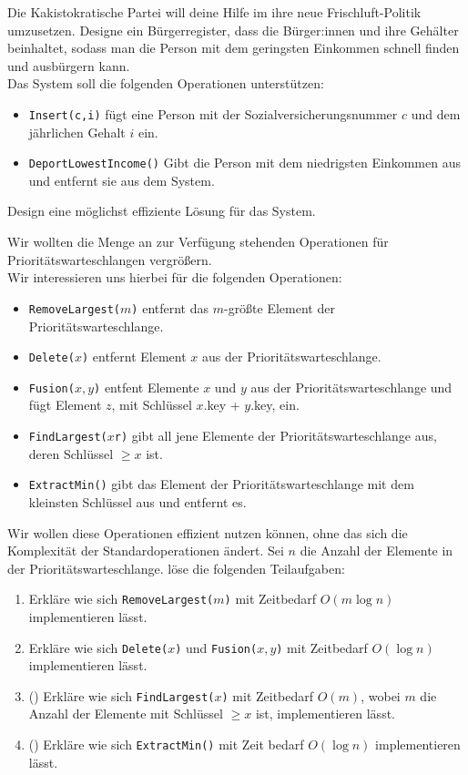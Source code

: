 \documentclass{uebung_cs}
\begin{document}
\begin{aufgabe}
	Die Kakistokratische Partei will deine Hilfe im ihre neue \glqq Frischluft\grqq{}-Politik umzusetzen.
	Designe ein Bürgerregister, dass die Bürger:innen und ihre Gehälter beinhaltet, sodass man die Person mit dem geringsten Einkommen schnell finden und ausbürgern kann.\\
	Das System soll die folgenden Operationen unterstützen:
	\begin{itemize}
		\item \texttt{Insert(c,i)} fügt eine Person mit der Sozialversicherungsnummer $c$ und dem jährlichen Gehalt $i$ ein.
		\item \texttt{DeportLowestIncome()} Gibt die Person mit dem niedrigsten Einkommen aus und entfernt sie aus dem System.
	\end{itemize}
	Design eine möglichst effiziente Lösung für das System.
\end{aufgabe}

\begin{aufgabe}
	Wir wollten die Menge an zur Verfügung stehenden Operationen für Prioritätswarteschlangen vergrößern.\\
	Wir interessieren uns hierbei für die folgenden Operationen:
	\begin{itemize}
		\item \texttt{RemoveLargest($m$)} entfernt das $m$-größte Element der Prioritätswarteschlange.
		\item \texttt{Delete($x$)} entfernt Element $x$ aus der Prioritätswarteschlange.
		\item \texttt{Fusion($x,y$)} entfent Elemente $x$ und $y$ aus der Prioritätswarteschlange und fügt Element $z$, mit Schlüssel $x$.key + $y$.key, ein.
		\item \texttt{FindLargest($x$r)} gibt all jene Elemente der Prioritätswarteschlange aus, deren Schlüssel $\geq x$ ist.
		\item \texttt{ExtractMin()} gibt das Element der Prioritätswarteschlange mit dem kleinsten Schlüssel aus und entfernt es.
	\end{itemize}
	Wir wollen diese Operationen effizient nutzen können, ohne das sich die Komplexität der Standardoperationen ändert.
	Sei $n$ die Anzahl der Elemente in der Prioritätswarteschlange.
	löse die folgenden Teilaufgaben:
	\begin{enumerate}
		\item Erkläre wie sich \texttt{RemoveLargest($m$)} mit Zeitbedarf $O(m\log n)$ implementieren lässt.
		\item Erkläre wie sich \texttt{Delete($x$)} und \texttt{Fusion($x,y$)} mit Zeitbedarf $O(\log n)$ implementieren lässt.
		\item (\hard) Erkläre wie sich \texttt{FindLargest($x$)} mit Zeitbedarf $O(m)$, wobei $m$ die Anzahl der Elemente mit Schlüssel $\geq x$ ist, implementieren lässt.
		\item (\hard) Erkläre wie sich \texttt{ExtractMin()} mit Zeit bedarf $O(\log n)$ implementieren lässt.
	\end{enumerate}
\end{aufgabe}
\end{document}

